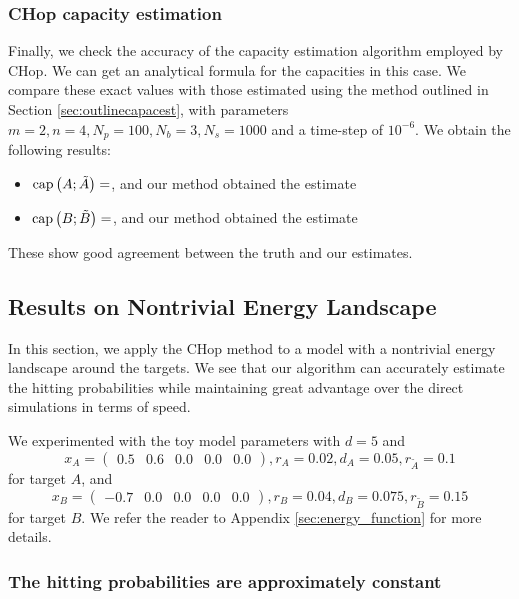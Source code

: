 \documentclass[english, aip, jcp, priprint, graphicx,floatfix]{revtex4-1}
\theoremstyle{plain}
\theoremstyle{definition}
\theoremstyle{plain}
\begin{document}
\subsubsection{CHop capacity estimation}

Finally, we check the accuracy of the capacity estimation algorithm employed by CHop.  We can get an analytical formula for the capacities in this case.  We compare these exact values with those estimated using the method outlined in Section \ref{sec:outlinecapacest}, with parameters $m = 2, n = 4, N_p = 100, N_b = 3,N_s = 1000$ and a time-step of $10^{-6}$.  We obtain the following results:

\begin{itemize}
\item $\mathrm{cap}\left(A;\tilde{A}\right)=$\TODOTHIS, and our method obtained the estimate \TODOTHIS
\item $\mathrm{cap}\left(B;\tilde{B}\right)=$\TODOTHIS, and our method obtained the estimate \TODOTHIS
\end{itemize}

These show good agreement between the truth and our estimates.

\subsection{Results on Nontrivial Energy Landscape}

In this section, we apply the CHop method to a model with a nontrivial energy landscape around the targets. We see that our algorithm can accurately estimate the hitting probabilities while maintaining great advantage over the direct simulations in terms of speed.

We experimented with the toy model parameters with $d = 5$ and
\begin{equation*}
x_A = \begin{pmatrix}%
0.5&0.6&0.0&0.0&0.0%
\end{pmatrix},
r_A = 0.02,
d_A = 0.05,
r_{\tilde{A}} = 0.1
\end{equation*}
for target $A$, and
\begin{equation*}
x_B = \begin{pmatrix}%
-0.7&0.0&0.0&0.0&0.0%
\end{pmatrix},
r_B = 0.04,
d_B = 0.075,
r_{\tilde{B}} = 0.15
\end{equation*}
for target $B$.  We refer the reader to Appendix \ref{sec:energy_function} for more details.

\subsubsection{The hitting probabilities are approximately constant}
\end{document}
